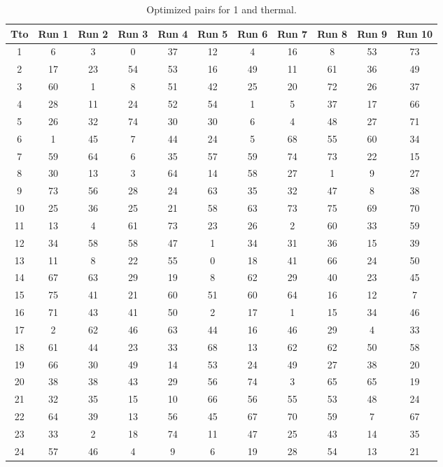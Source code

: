 \begin{table}
  \centering
  \scriptsize
  \caption{Optimized pairs for 1 and thermal.}
  \label{tab_pairs}
\begin{tabular}{c c c c c c c c c c c }
\hline
Tto & Run 1 & Run 2 & Run 3 & Run 4 & Run 5 & Run 6 & Run 7 & Run 8 & Run 9 & Run 10 \\
\hline
1 & 6 & 3 & 0 & 37 & 12 & 4 & 16 & 8 & 53 & 73 \\
2 & 17 & 23 & 54 & 53 & 16 & 49 & 11 & 61 & 36 & 49 \\
3 & 60 & 1 & 8 & 51 & 42 & 25 & 20 & 72 & 26 & 37 \\
4 & 28 & 11 & 24 & 52 & 54 & 1 & 5 & 37 & 17 & 66 \\
5 & 26 & 32 & 74 & 30 & 30 & 6 & 4 & 48 & 27 & 71 \\
6 & 1 & 45 & 7 & 44 & 24 & 5 & 68 & 55 & 60 & 34 \\
7 & 59 & 64 & 6 & 35 & 57 & 59 & 74 & 73 & 22 & 15 \\
8 & 30 & 13 & 3 & 64 & 14 & 58 & 27 & 1 & 9 & 27 \\
9 & 73 & 56 & 28 & 24 & 63 & 35 & 32 & 47 & 8 & 38 \\
10 & 25 & 36 & 25 & 21 & 58 & 63 & 73 & 75 & 69 & 70 \\
11 & 13 & 4 & 61 & 73 & 23 & 26 & 2 & 60 & 33 & 59 \\
12 & 34 & 58 & 58 & 47 & 1 & 34 & 31 & 36 & 15 & 39 \\
13 & 11 & 8 & 22 & 55 & 0 & 18 & 41 & 66 & 24 & 50 \\
14 & 67 & 63 & 29 & 19 & 8 & 62 & 29 & 40 & 23 & 45 \\
15 & 75 & 41 & 21 & 60 & 51 & 60 & 64 & 16 & 12 & 7 \\
16 & 71 & 43 & 41 & 50 & 2 & 17 & 1 & 15 & 34 & 46 \\
17 & 2 & 62 & 46 & 63 & 44 & 16 & 46 & 29 & 4 & 33 \\
18 & 61 & 44 & 23 & 33 & 68 & 13 & 62 & 62 & 50 & 58 \\
19 & 66 & 30 & 49 & 14 & 53 & 24 & 49 & 27 & 38 & 20 \\
20 & 38 & 38 & 43 & 29 & 56 & 74 & 3 & 65 & 65 & 19 \\
21 & 32 & 35 & 15 & 10 & 66 & 56 & 55 & 53 & 48 & 24 \\
22 & 64 & 39 & 13 & 56 & 45 & 67 & 70 & 59 & 7 & 67 \\
23 & 33 & 2 & 18 & 74 & 11 & 47 & 25 & 43 & 14 & 35 \\
24 & 57 & 46 & 4 & 9 & 6 & 19 & 28 & 54 & 13 & 21 \\

\end{tabular}
\end{table}
